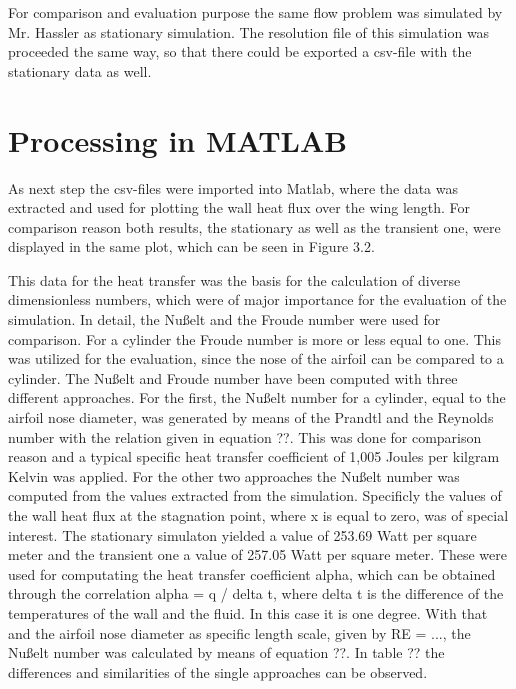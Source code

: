 For comparison and evaluation purpose the same flow problem was simulated by Mr. Hassler as stationary simulation. The resolution file of this simulation was proceeded the same way, so that there could be exported a csv-file with the stationary data as well.
\section{Processing in MATLAB\textsuperscript{\textregistered}}
As next step the csv-files were imported into Matlab, where the data was extracted and used for plotting the wall heat flux over the wing length. For comparison reason both results, the stationary as well as the transient one, were displayed in the same plot, which can be seen in Figure 3.2. 

This data for the heat transfer was the basis for the calculation of diverse dimensionless numbers, which were of major importance for the evaluation of the simulation.
In detail, the Nußelt and the Froude number were used for comparison. For a cylinder the Froude number is more or less equal to one. This was utilized for the evaluation, since the nose of the airfoil can be compared to a cylinder.
The Nußelt and Froude number have been computed with three different approaches. For the first, the Nußelt number for a cylinder, equal to the airfoil nose diameter, was generated by means of the Prandtl and the Reynolds number with the relation given in equation ??. This was done for comparison reason and a typical specific heat transfer coefficient of 1,005 Joules per kilgram Kelvin was applied.
For the other two approaches the Nußelt number was computed from the values extracted from the simulation. Specificly the values of the wall heat flux at the stagnation point, where x is equal to zero, was of special interest. The stationary simulaton yielded a value of 253.69 Watt per square meter and the transient one a value of 257.05 Watt per square meter. These were used  for computating the heat transfer coefficient alpha, which can be obtained through the correlation
alpha = q / delta t, 
where delta t is the difference of the temperatures of the wall and the fluid. In this case it is one degree. With that and the airfoil nose diameter as specific length scale, given by
RE = ...,
the Nußelt number was calculated by means of equation ??.
In table ?? the differences and similarities of the single approaches can be observed.

